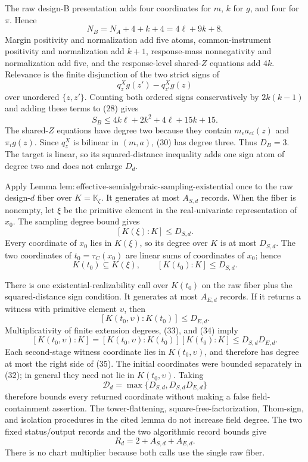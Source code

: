 The raw design-B presentation adds four coordinates for \(m\), \(k\) for \(g\), and four for \(\pi\).  Hence
\[
 N_B=N_A+4+k+4=4\ell+9k+8.                               \tag{29}
\]
Margin positivity and normalization add five atoms, common-instrument positivity and normalization add \(k+1\), response-mass nonnegativity and normalization add five, and the response-level shared-\(Z\) equations add \(4k\).  Relevance is the finite disjunction of the two strict signs of
\[
 q^X_zg(z')-q^X_{z'}g(z)                                  \tag{30}
\]
over unordered \(\{z,z'\}\).  Counting both ordered signs conservatively by \(2k(k-1)\) and adding these terms to (28) gives
\[
 S_B\le 4k\ell+2k^2+4\ell+15k+15.                        \tag{31}
\]
The shared-\(Z\) equations have degree two because they contain \(m_ea_{ei}(z)\) and \(\pi_i g(z)\).  Since \(q^X_z\) is bilinear in \((m,a)\), (30) has degree three.  Thus \(D_B=3\).  The target is linear, so its squared-distance inequality adds one sign atom of degree two and does not enlarge \(D_d\).

Apply Lemma \(\mathrm{lem{:}effective\text{-}semialgebraic\text{-}sampling\text{-}existential}\) once to the raw design-\(d\) fiber over \(K=\mathbb K_{\zeta}\).  It generates at most \(A_{S,d}\) records.  When the fiber is nonempty, let \(\xi\) be the primitive element in the real-univariate representation of \(x_0\).  The sampling degree bound gives
\[
 [K(\xi):K]\le D_{S,d}.                                  \tag{32}
\]
Every coordinate of \(x_0\) lies in \(K(\xi)\), so its degree over \(K\) is at most \(D_{S,d}\).  The two coordinates of \(t_0=\tau_C(x_0)\) are linear sums of coordinates of \(x_0\); hence
\[
 K(t_0)\subseteq K(\xi),
 \qquad [K(t_0):K]\le D_{S,d}.                           \tag{33}
\]

There is one existential-realizability call over \(K(t_0)\) on the raw fiber plus the squared-distance sign condition.  It generates at most \(A_{E,d}\) records.  If it returns a witness with primitive element \(\upsilon\), then
\[
 [K(t_0,\upsilon):K(t_0)]\le D_{E,d}.                    \tag{34}
\]
Multiplicativity of finite extension degrees, (33), and (34) imply
\[
 [K(t_0,\upsilon):K]
 =[K(t_0,\upsilon):K(t_0)][K(t_0):K]
 \le D_{S,d}D_{E,d}.                                     \tag{35}
\]
Each second-stage witness coordinate lies in \(K(t_0,\upsilon)\), and therefore has degree at most the right side of (35).  The initial coordinates were bounded separately in (32); in general they need not lie in \(K(t_0,\upsilon)\).  Taking
\[
 \mathcal D_d=\max\{D_{S,d},D_{S,d}D_{E,d}\}             \tag{36}
\]
therefore bounds every returned coordinate without making a false field-containment assertion.  The tower-flattening, square-free-factorization, Thom-sign, and isolation procedures in the cited lemma do not increase field degree.  The two fixed status/output records and the two algorithmic record bounds give
\[
 R_d=2+A_{S,d}+A_{E,d}.                                   \tag{37}
\]
There is no chart multiplier because both calls use the single raw fiber.

